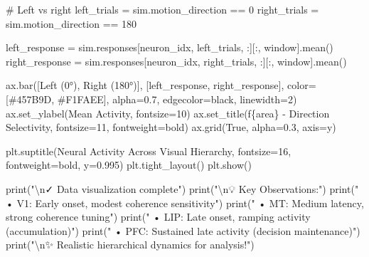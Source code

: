\documentclass[
  11pt,
  letterpaper,
  oneside,
  openany]{book}
\newenvironment{Shaded}{\begin{snugshade}}{\end{snugshade}}
\newcommand{\BuiltInTok}[1]{\textcolor[rgb]{0.00,0.23,0.31}{#1}}
\newcommand{\CharTok}[1]{\textcolor[rgb]{0.13,0.47,0.30}{#1}}
\newcommand{\CommentTok}[1]{\textcolor[rgb]{0.37,0.37,0.37}{#1}}
\newcommand{\DecValTok}[1]{\textcolor[rgb]{0.68,0.00,0.00}{#1}}
\newcommand{\FloatTok}[1]{\textcolor[rgb]{0.68,0.00,0.00}{#1}}
\newcommand{\NormalTok}[1]{\textcolor[rgb]{0.00,0.23,0.31}{#1}}
\newcommand{\OperatorTok}[1]{\textcolor[rgb]{0.37,0.37,0.37}{#1}}
\newcommand{\SpecialCharTok}[1]{\textcolor[rgb]{0.37,0.37,0.37}{#1}}
\newcommand{\SpecialStringTok}[1]{\textcolor[rgb]{0.13,0.47,0.30}{#1}}
\newcommand{\StringTok}[1]{\textcolor[rgb]{0.13,0.47,0.30}{#1}}
\newcommand{\VariableTok}[1]{\textcolor[rgb]{0.07,0.07,0.07}{#1}}
\begin{document}
\begin{Shaded}
\begin{Highlighting}[]
    \CommentTok{\# Left vs right}
\NormalTok{    left\_trials }\OperatorTok{=}\NormalTok{ sim.motion\_direction }\OperatorTok{==} \DecValTok{0}
\NormalTok{    right\_trials }\OperatorTok{=}\NormalTok{ sim.motion\_direction }\OperatorTok{==} \DecValTok{180}
    
\NormalTok{    left\_response }\OperatorTok{=}\NormalTok{ sim.responses[neuron\_idx, left\_trials, :][:, window].mean()}
\NormalTok{    right\_response }\OperatorTok{=}\NormalTok{ sim.responses[neuron\_idx, right\_trials, :][:, window].mean()}
    
\NormalTok{    ax.bar([}\StringTok{\textquotesingle{}Left (0°)\textquotesingle{}}\NormalTok{, }\StringTok{\textquotesingle{}Right (180°)\textquotesingle{}}\NormalTok{], [left\_response, right\_response],}
\NormalTok{          color}\OperatorTok{=}\NormalTok{[}\StringTok{\textquotesingle{}\#457B9D\textquotesingle{}}\NormalTok{, }\StringTok{\textquotesingle{}\#F1FAEE\textquotesingle{}}\NormalTok{], alpha}\OperatorTok{=}\FloatTok{0.7}\NormalTok{, edgecolor}\OperatorTok{=}\StringTok{\textquotesingle{}black\textquotesingle{}}\NormalTok{, linewidth}\OperatorTok{=}\DecValTok{2}\NormalTok{)}
\NormalTok{    ax.set\_ylabel(}\StringTok{\textquotesingle{}Mean Activity\textquotesingle{}}\NormalTok{, fontsize}\OperatorTok{=}\DecValTok{10}\NormalTok{)}
\NormalTok{    ax.set\_title(}\SpecialStringTok{f\textquotesingle{}}\SpecialCharTok{\{}\NormalTok{area}\SpecialCharTok{\}}\SpecialStringTok{ {-} Direction Selectivity\textquotesingle{}}\NormalTok{, fontsize}\OperatorTok{=}\DecValTok{11}\NormalTok{, fontweight}\OperatorTok{=}\StringTok{\textquotesingle{}bold\textquotesingle{}}\NormalTok{)}
\NormalTok{    ax.grid(}\VariableTok{True}\NormalTok{, alpha}\OperatorTok{=}\FloatTok{0.3}\NormalTok{, axis}\OperatorTok{=}\StringTok{\textquotesingle{}y\textquotesingle{}}\NormalTok{)}

\NormalTok{plt.suptitle(}\StringTok{\textquotesingle{}Neural Activity Across Visual Hierarchy\textquotesingle{}}\NormalTok{, }
\NormalTok{             fontsize}\OperatorTok{=}\DecValTok{16}\NormalTok{, fontweight}\OperatorTok{=}\StringTok{\textquotesingle{}bold\textquotesingle{}}\NormalTok{, y}\OperatorTok{=}\FloatTok{0.995}\NormalTok{)}
\NormalTok{plt.tight\_layout()}
\NormalTok{plt.show()}

\BuiltInTok{print}\NormalTok{(}\StringTok{"}\CharTok{\textbackslash{}n}\StringTok{✓ Data visualization complete"}\NormalTok{)}
\BuiltInTok{print}\NormalTok{(}\StringTok{"}\CharTok{\textbackslash{}n}\StringTok{💡 Key Observations:"}\NormalTok{)}
\BuiltInTok{print}\NormalTok{(}\StringTok{"   • V1: Early onset, modest coherence sensitivity"}\NormalTok{)}
\BuiltInTok{print}\NormalTok{(}\StringTok{"   • MT: Medium latency, strong coherence tuning"}\NormalTok{)}
\BuiltInTok{print}\NormalTok{(}\StringTok{"   • LIP: Late onset, ramping activity (accumulation)"}\NormalTok{)}
\BuiltInTok{print}\NormalTok{(}\StringTok{"   • PFC: Sustained late activity (decision maintenance)"}\NormalTok{)}
\BuiltInTok{print}\NormalTok{(}\StringTok{"}\CharTok{\textbackslash{}n}\StringTok{✨ Realistic hierarchical dynamics for analysis!"}\NormalTok{)}
\end{Highlighting}
\end{Shaded}
\end{document}
